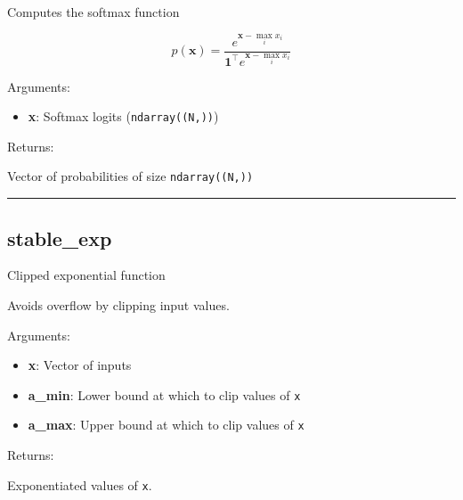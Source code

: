 \begin{Shaded}
\begin{Highlighting}[]
\end{Highlighting}
\end{Shaded}

Computes the softmax function

\[
p(\mathbf{x}) = \frac{e^{\mathbf{x} - \max_i x_i}}{\mathbf{1}^\top e^{\mathbf{x} - \max_i x_i}}
\]

Arguments:

\begin{itemize}
\tightlist
\item
  \textbf{x}: Softmax logits (\texttt{ndarray((N,))})
\end{itemize}

Returns:

Vector of probabilities of size \texttt{ndarray((N,))}

\begin{center}\rule{0.5\linewidth}{\linethickness}\end{center}

\subsection{stable\_exp}\label{stable_exp}

\begin{Shaded}
\begin{Highlighting}[]
\OperatorTok{=-}\OperatorTok{=}\NormalTok{)}
\end{Highlighting}
\end{Shaded}

Clipped exponential function

Avoids overflow by clipping input values.

Arguments:

\begin{itemize}
\tightlist
\item
  \textbf{x}: Vector of inputs
\item
  \textbf{a\_min}: Lower bound at which to clip values of \texttt{x}
\item
  \textbf{a\_max}: Upper bound at which to clip values of \texttt{x}
\end{itemize}

Returns:

Exponentiated values of \texttt{x}.

